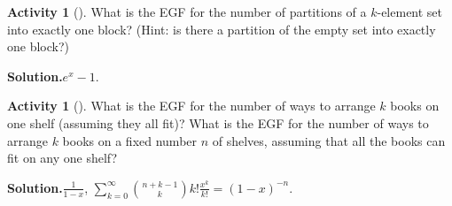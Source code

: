 \documentclass[10pt,]{book}
\theoremstyle{plain}
\theoremstyle{definition}
\newtheorem{activity}[project]{Activity}
\numberwithin{equation}{chapter}
\begin{document}
\begin{activity}[]\label{oneblockpartitions}
What is the EGF for the number of partitions of a \(k\)-element set into exactly one block? (Hint: is there a partition of the empty set into exactly one block?)%
\par\medskip\noindent%
\textbf{Solution.}\quad \(e^x-1\).%
\end{activity}
\begin{activity}[]\label{exponentialbookshelf}
What is the EGF for the number of ways to arrange \(k\) books on one shelf (assuming they all fit)? What is the EGF for the number of ways to arrange \(k\) books on a fixed number \(n\) of shelves, assuming that all the books can fit on any one shelf?%
\par\medskip\noindent%
\textbf{Solution.}\quad \(\frac{1}{1-x}\), \(\sum_{k=0}^\infty \binom{n+k-1}{k}k!\frac{x^k}{k!} = (1-x)^{-n}\).%
\end{activity}
\typeout{************************************************}
\typeout{************************************************}
\end{document}
